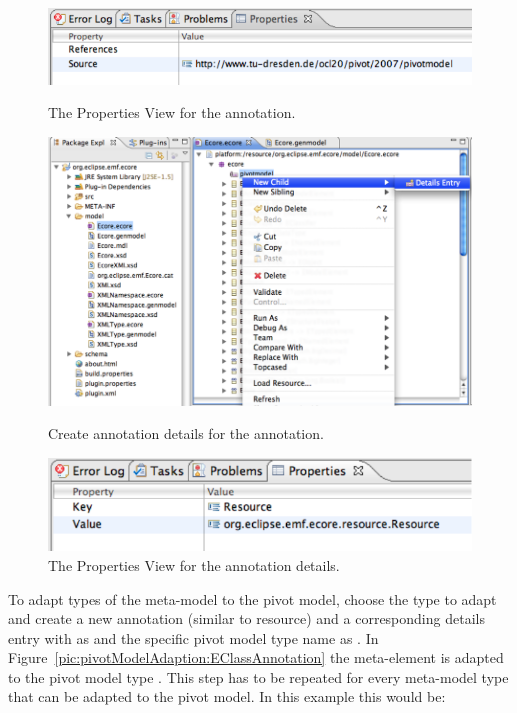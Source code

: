 \begin{figure}[!p]
	\centering
	\includegraphics[width=0.8\linewidth]{figures/pivotModelAdaption/AnnotationProperties}
	\caption{The Properties View for the annotation.}
	\label{pic:pivotModelAdaption:AnnotationProperties}

  \vspace{5.0em}
 
 	\centering
	\includegraphics[width=1.0\linewidth]{figures/pivotModelAdaption/CreateAnnotationDetails}
	\caption{Create annotation details for the annotation.}
	\label{pic:pivotModelAdaption:CreateAnnotationDetails}

  \vspace{5.0em}
 
 	\centering
	\includegraphics[width=0.8\linewidth]{figures/pivotModelAdaption/AnnotationDetailsProperties}
	\caption{The Properties View for the annotation details.}
	\label{pic:pivotModelAdaption:AnnotationDetailsProperties}
\end{figure}

To adapt types of the meta-model to the pivot model, choose the type to adapt
and create a new annotation (similar to resource) and a corresponding details 
entry with  as  and the specific pivot model type
name as . In Figure~\ref{pic:pivotModelAdaption:EClassAnnotation}
the meta-element  is adapted to the pivot model type .
This step has to be repeated for every meta-model type that can be adapted to
the pivot model. In this example this would be:

